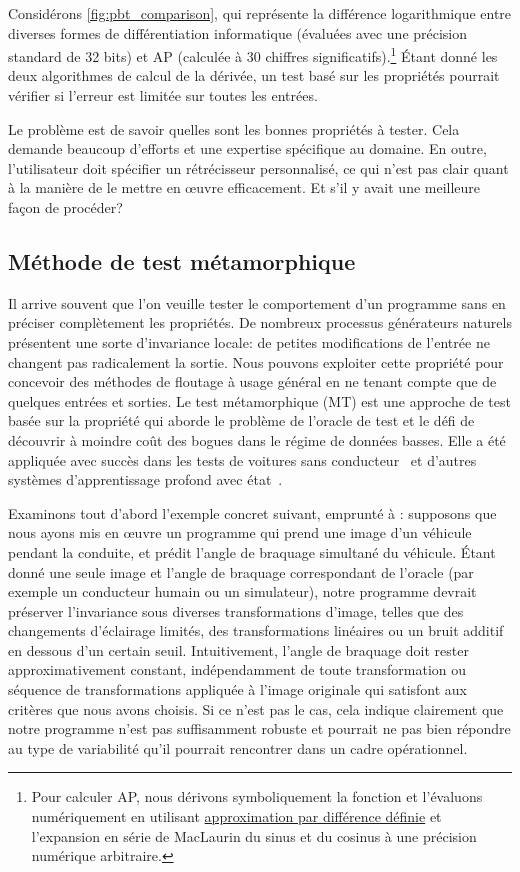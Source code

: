 %
Considérons \autoref{fig:pbt_comparison}, qui représente la différence logarithmique entre diverses formes de différentiation informatique (évaluées avec une précision standard de 32 bits) et AP (calculée à 30 chiffres significatifs).\hspace{-.08em}\footnote{Pour calculer AP, nous dérivons symboliquement la fonction et l'évaluons numériquement en utilisant \hyperref[sec:fdm]{approximation par différence définie} et l'expansion en série de MacLaurin du sinus et du cosinus à une précision numérique arbitraire.} Étant donné les deux algorithmes de calcul de la dérivée, un test basé sur les propriétés pourrait vérifier si l'erreur est limitée sur toutes les entrées.

Le problème est de savoir quelles sont les bonnes propriétés à tester. Cela demande beaucoup d'efforts et une expertise spécifique au domaine. En outre, l'utilisateur doit spécifier un rétrécisseur personnalisé, ce qui n'est pas clair quant à la manière de le mettre en œuvre efficacement. Et s'il y avait une meilleure façon de procéder?

\subsection{Méthode de test métamorphique}\label{subsec:metamorphic-testing}

Il arrive souvent que l'on veuille tester le comportement d'un programme sans en préciser complètement les propriétés. De nombreux processus générateurs naturels présentent une sorte d'invariance locale: de petites modifications de l'entrée ne changent pas radicalement la sortie. Nous pouvons exploiter cette propriété pour concevoir des méthodes de floutage à usage général en ne tenant compte que de quelques entrées et sorties. Le test métamorphique (MT) est une approche de test basée sur la propriété qui aborde le problème de l'oracle de test et le défi de découvrir à moindre coût des bogues dans le régime de données basses. Elle a été appliquée avec succès dans les tests de voitures sans conducteur~\citep{zhou2019metamorphic, pei2017deepxplore, tian2018deeptest} et d'autres systèmes d'apprentissage profond avec état~\citep{du2018deepcruiser}.

Examinons tout d'abord l'exemple concret suivant, emprunté à \citet{tian2018deeptest}: supposons que nous ayons mis en œuvre un programme qui prend une image d'un véhicule pendant la conduite, et prédit l'angle de braquage simultané du véhicule. Étant donné une seule image et l'angle de braquage correspondant de l'oracle (par exemple un conducteur humain ou un simulateur), notre programme devrait préserver l'invariance sous diverses transformations d'image, telles que des changements d'éclairage limités, des transformations linéaires ou un bruit additif en dessous d'un certain seuil. Intuitivement, l'angle de braquage doit rester approximativement constant, indépendamment de toute transformation ou séquence de transformations appliquée à l'image originale qui satisfont aux critères que nous avons choisis. Si ce n'est pas le cas, cela indique clairement que notre programme n'est pas suffisamment robuste et pourrait ne pas bien répondre au type de variabilité qu'il pourrait rencontrer dans un cadre opérationnel.

